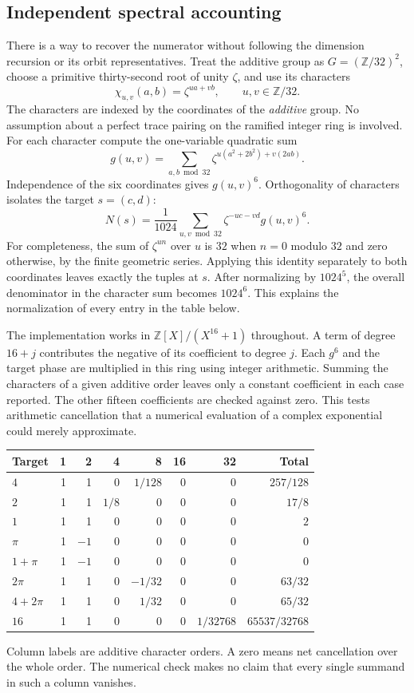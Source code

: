 \documentclass[12pt,letterpaper]{article}
\begin{document}
\subsection{Independent spectral accounting}
There is a way to recover the numerator without following the dimension recursion or its orbit representatives. Treat the additive group as $G=(\mathbb Z/32)^2$, choose a primitive thirty-second root of unity $\zeta$, and use its characters
\[
     \chi_{u,v}(a,b)=\zeta^{ua+vb},\qquad u,v\in\mathbb Z/32 .
\]
The characters are indexed by the coordinates of the \emph{additive} group. No assumption about a perfect trace pairing on the ramified integer ring is involved. For each character compute the one-variable quadratic sum
\[
 g(u,v)=\sum_{a,b\bmod32}\zeta^{u(a^2+2b^2)+v(2ab)} .
\]
Independence of the six coordinates gives $g(u,v)^6$. Orthogonality of characters isolates the target $s=(c,d)$:
\[
 N(s)=\frac1{1024}\sum_{u,v\bmod32}\zeta^{-uc-vd}g(u,v)^6.
\]
For completeness, the sum of $\zeta^{un}$ over $u$ is $32$ when $n=0$ modulo $32$ and zero otherwise, by the finite geometric series. Applying this identity separately to both coordinates leaves exactly the tuples at $s$. After normalizing by $1024^5$, the overall denominator in the character sum becomes $1024^6$. This explains the normalization of every entry in the table below.
\par
The implementation works in $\mathbb Z[X]/(X^{16}+1)$ throughout. A term of degree $16+j$ contributes the negative of its coefficient to degree $j$. Each $g^6$ and the target phase are multiplied in this ring using integer arithmetic. Summing the characters of a given additive order leaves only a constant coefficient in each case reported. The other fifteen coefficients are checked against zero. This tests arithmetic cancellation that a numerical evaluation of a complex exponential could merely approximate.
\begin{center}\small\begin{tabular}{lrrrrrrr}\toprule
Target&1&2&4&8&16&32&Total\\\midrule
$4$&1&1&0&$1/128$&0&0&$257/128$\\
$2$&1&1&$1/8$&0&0&0&$17/8$\\
$1$&1&1&0&0&0&0&$2$\\
$\pi$&1&$-1$&0&0&0&0&$0$\\
$1+\pi$&1&$-1$&0&0&0&0&$0$\\
$2\pi$&1&1&0&$-1/32$&0&0&$63/32$\\
$4+2\pi$&1&1&0&$1/32$&0&0&$65/32$\\
$16$&1&1&0&0&0&$1/32768$&$65537/32768$\\\bottomrule
\end{tabular}\end{center}
Column labels are additive character orders. A zero means net cancellation over the whole order. The numerical check makes no claim that every single summand in such a column vanishes.
\end{document}
